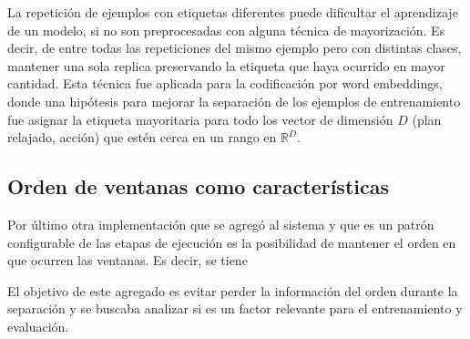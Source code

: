 La repetición de ejemplos con etiquetas diferentes puede dificultar el aprendizaje de un modelo, si no son preprocesadas con alguna técnica de mayorización. Es decir, de entre todas las repeticiones del mismo ejemplo pero con distintas clases, mantener una sola replica preservando la etiqueta que haya ocurrido en mayor cantidad. Esta técnica fue aplicada para la codificación por word embeddings, donde una hipótesis para mejorar la separación de los ejemplos de entrenamiento fue asignar la etiqueta mayoritaria para todo los vector de dimensión $D$ (plan relajado, acción) que estén cerca en un rango en $\mathbb{R}^{D}$.

\subsection{Orden de ventanas como características}

Por último otra implementación que se agregó al sistema y que es un patrón configurable de las etapas de ejecución es la posibilidad de mantener el orden en que ocurren las ventanas. Es decir, se tiene

\begin{table}[h!]
\centering
{}
 \caption{Ejemplos etiquetados a partir de un plan relajado y una acción}
 \label{tb:matrix_shape}
\end{table}

El objetivo de este agregado es evitar perder la información del orden durante la separación y se buscaba analizar si es un factor relevante para el entrenamiento y evaluación.